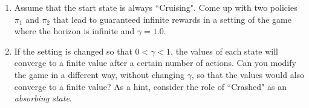 \documentclass{worksheet}
\begin{document}
\begin{question}
\begin{enumerate}
    \item Assume that the start state is always ``Cruising". Come up with two policies $\pi_1$ and $\pi_2$ that lead to guaranteed infinite rewards in a setting of the game where the horizon is infinite and $\gamma = 1.0$.
    \item If the setting is changed so that $0 < \gamma < 1$, the values of each state will converge to a finite value after a certain number of actions. Can you modify the game in a different way, without changing $\gamma$, so that the values would also converge to a finite value? As a hint, consider the role of ``Crashed" as an \textit{absorbing state}.
\end{enumerate}

\end{question}



\end{document}
